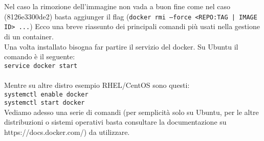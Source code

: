 Nel caso la rimozione dell'immagine non vada a buon fine come nel caso (8126e3300de2) basta aggiunger il flag (\texttt{docker rmi --force <REPO:TAG | IMAGE ID> ...})
Ecco una breve riassunto dei principali comandi più usati nella gestione di un container.\\
Una volta installato bisogna far partire il servizio del docker. Su Ubuntu il comando è il seguente:\\
\texttt{service docker start}\\\\
Mentre su altre distro esempio RHEL/CentOS sono questi:\\
\texttt{systemctl enable docker}\\
\texttt{systemctl start docker}\\
Vediamo adesso una serie di comandi (per semplicità solo su Ubuntu, per le altre distribuzioni o sistemi operativi basta consultare la documentazione su https://docs.docker.com/) da utilizzare.\\
